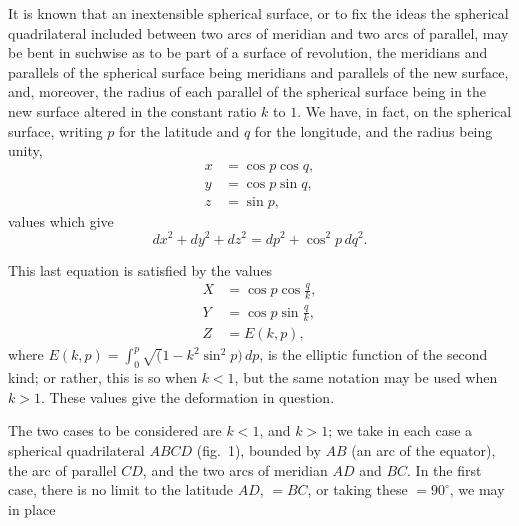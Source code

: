 \documentclass[12pt,a4paper]{article}
\theoremstyle{plain}
\theoremstyle{definition}
\theoremstyle{remark}
\begin{document}
It is known that an inextensible spherical surface, or to fix the ideas the spherical quadrilateral included between two arcs of meridian and two arcs of parallel, may be bent in suchwise as to be part of a surface of revolution, the meridians and parallels of the spherical surface being meridians and parallels of the new surface, and, moreover, the radius of each parallel of the spherical surface being in the new surface altered in the constant ratio $k$ to $1$. We have, in fact, on the spherical surface, writing $p$ for the latitude and $q$ for the longitude, and the radius being unity,
\begin{align*}
x &= \cos p \cos q, \\
y &= \cos p \sin q, \\
z &= \sin p,
\end{align*}
values which give
\[
dx^2 + dy^2 + dz^2 = dp^2 + \cos^2 p\, dq^2.
\]

This last equation is satisfied by the values
\begin{align*}
X &= \cos p \cos\tfrac{q}{k}, \\
Y &= \cos p \sin\tfrac{q}{k}, \\
Z &= E(k, p),
\end{align*}
where $E(k, p) = \int_0^p \surd(1 - k^2 \sin^2 p)\, dp$, is the elliptic function of the second kind; or rather, this is so when $k < 1$, but the same notation may be used when $k > 1$. These values give the deformation in question.

The two cases to be considered are $k < 1$, and $k > 1$; we take in each case a spherical quadrilateral $ABCD$ (fig.~1), bounded by $AB$ (an arc of the equator), the arc of parallel $CD$, and the two arcs of meridian $AD$ and $BC$. In the first case, there is no limit to the latitude $AD$, $= BC$, or taking these $= 90^\circ$, we may in place
\end{document}

